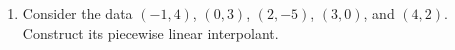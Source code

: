 \documentclass[11pt,letterpaper]{article}
\begin{document}
\begin{enumerate}
\item Consider the data $(-1,4)$, $(0,3)$, $(2,-5)$, $(3,0)$, and $(4,2)$. Construct its piecewise linear interpolant.

\end{enumerate}
\end{document}
